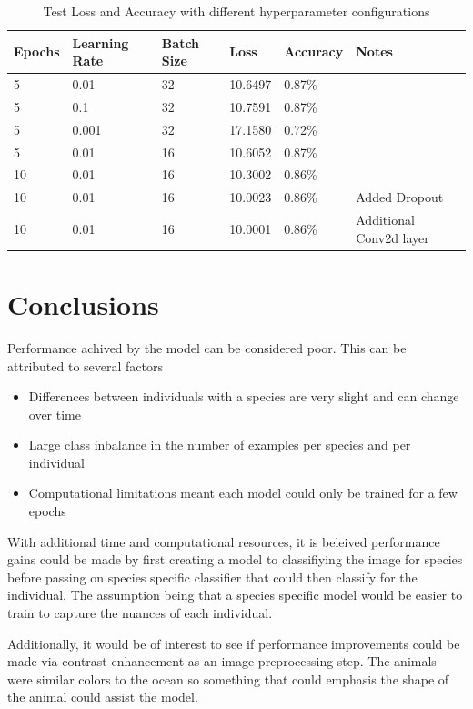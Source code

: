 \documentclass{article}
\begin{document}
\begin{table}[ht]
\centering
\begin{tabularx}{\textwidth}{|X|X|X|X|X|X|}
\hline
\textbf{Epochs} & \textbf{Learning Rate} & \textbf{Batch Size} & \textbf{Loss} & \textbf{Accuracy} & \textbf{Notes} \\
\hline
5 & 0.01 & 32 & 10.6497 & 0.87\% & \\
\hline
5 & 0.1 & 32 & 10.7591 & 0.87\% &  \\
\hline
5 & 0.001 & 32 & 17.1580 & 0.72\% & \\
\hline
5 & 0.01 & 16 & 10.6052 & 0.87\% & \\
\hline
10 & 0.01 & 16 & 10.3002 & 0.86\% & \\
\hline
10 & 0.01 & 16 & 10.0023 & 0.86\% & Added Dropout \\
\hline
10 & 0.01 & 16 & 10.0001 & 0.86\% & Additional Conv2d layer \\
\hline
\end{tabularx}
\caption{Test Loss and Accuracy with different hyperparameter configurations}
\label{tab:example}
\end{table}

\section{Conclusions}

Performance achived by the model can be considered poor. This can be attributed to several factors

\begin{itemize}
    \item Differences between individuals with a species are very slight and can change over time
    \item Large class inbalance in the number of examples per species and per individual
    \item Computational limitations meant each model could only be trained for a few epochs
\end{itemize}

With additional time and computational resources, it is beleived performance gains could be made by first creating a model to classifiying the image for 
species before passing on species specific classifier that could then classify for the individual. The assumption being that a species specific model would
be easier to train to capture the nuances of each individual.


Additionally, it would be of interest to see if performance improvements could be made via contrast enhancement as an image preprocessing step. The animals were 
similar colors to the ocean so something that could emphasis the shape of the animal could assist the model.





\end{document}
